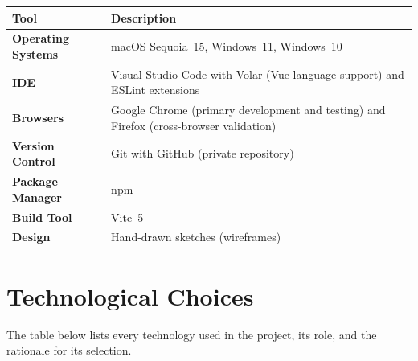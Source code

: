 \documentclass[12pt,a4paper,oneside]{report}
\begin{document}
\begin{tabularx}{\linewidth}{>{\bfseries}lX}
  \toprule
  Tool & Description \\
  \midrule
  Operating Systems & macOS Sequoia~15, Windows~11, Windows~10 \\
  \addlinespace
  IDE & Visual Studio Code with Volar (Vue language support) and
        ESLint extensions \\
  \addlinespace
  Browsers & Google Chrome (primary development and testing) and
             Firefox (cross-browser validation) \\
  \addlinespace
  Version Control & Git with GitHub (private repository) \\
  \addlinespace
  Package Manager & npm \\
  \addlinespace
  Build Tool & Vite~5 \\
  \addlinespace
  Design & Hand-drawn sketches (wireframes) \\
  \bottomrule
\end{tabularx}

\section{Technological Choices}

The table below lists every technology used in the project, its role, and the
rationale for its selection.
\end{document}

